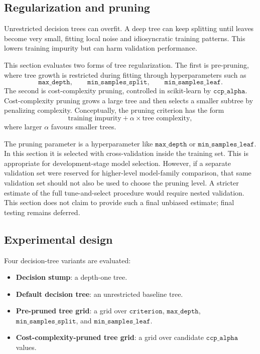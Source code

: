 \subsection{Regularization and pruning}

Unrestricted decision trees can overfit. A deep tree can keep splitting until leaves become very small, fitting local noise and idiosyncratic training patterns. This lowers training impurity but can harm validation performance.

This section evaluates two forms of tree regularization. The first is pre-pruning, where tree growth is restricted during fitting through hyperparameters such as
\[
\texttt{max\_depth},\qquad
\texttt{min\_samples\_split},\qquad
\texttt{min\_samples\_leaf}.
\]
The second is cost-complexity pruning, controlled in scikit-learn by \(\texttt{ccp\_alpha}\). Cost-complexity pruning grows a large tree and then selects a smaller subtree by penalizing complexity. Conceptually, the pruning criterion has the form
\[
\text{training impurity}
+
\alpha \times \text{tree complexity},
\]
where larger \(\alpha\) favours smaller trees.

The pruning parameter is a hyperparameter like \(\texttt{max\_depth}\) or \(\texttt{min\_samples\_leaf}\). In this section it is selected with cross-validation inside the training set. This is appropriate for development-stage model selection. However, if a separate validation set were reserved for higher-level model-family comparison, that same validation set should not also be used to choose the pruning level. A stricter estimate of the full tune-and-select procedure would require nested validation. This section does not claim to provide such a final unbiased estimate; final testing remains deferred.

\subsection{Experimental design}

Four decision-tree variants are evaluated:

\begin{itemize}[leftmargin=*]
    \item \textbf{Decision stump}: a depth-one tree.
    \item \textbf{Default decision tree}: an unrestricted baseline tree.
    \item \textbf{Pre-pruned tree grid}: a grid over \(\texttt{criterion}\), \(\texttt{max\_depth}\), \(\texttt{min\_samples\_split}\), and \(\texttt{min\_samples\_leaf}\).
    \item \textbf{Cost-complexity-pruned tree grid}: a grid over candidate \(\texttt{ccp\_alpha}\) values.
\end{itemize}


